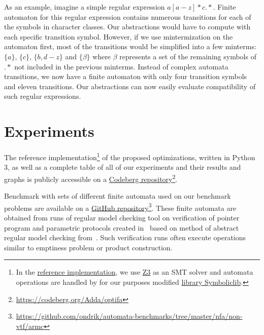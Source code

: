 As an example, imagine a simple regular expression $a[a-z]*c.*$. Finite automaton for this regular expression contains numerous transitions for each of the symbols in character classes. Our abstractions would have to compute with each specific transition symbol. However, if we use mintermization on the automaton first, most of the transitions would be simplified into a few minterms: $\{ a \}$, $\{ c \}$, $\{ b, d-z \}$ and $\{ \beta \}$ where $\beta$ represents a set of the remaining symbols of $.*$ not included in the previous minterms. Instead of complex automata transitions, we now have a finite automaton with only four transition symbols and eleven transitions. Our abstractions can now easily evaluate compatibility of such regular expressions.

\chapter{Experiments}\label{experimentsAndResultsChapter}

The reference implementation\footnote{In the \href{https://codeberg.org/Adda/optifa}{reference implementation}, we use \href{https://github.com/Z3Prover/z3}{Z3} as an SMT solver and automata operations are handled by for our purposes modified \href{https://codeberg.org/Adda/symboliclib}{library Symboliclib}.} of the proposed optimizations, written in Python 3, as well as a complete table of all of our experiments and their results and graphs is publicly accessible on a \href{https://codeberg.org/Adda/optifa}{Codeberg repository}\footnote{\url{https://codeberg.org/Adda/optifa}}.

Benchmark with sets of different finite automata used on our benchmark problems are available on a \href{https://github.com/ondrik/automata-benchmarks/tree/master/nfa/non-vtf/armc}{GitHub repository}\footnote{\url{https://github.com/ondrik/automata-benchmarks/tree/master/nfa/non-vtf/armc}}. These finite automata are obtained from runs of regular model checking tool on verification of pointer program and parametric protocols created in~\cite{model_checking_tool_10.1007/978-3-540-70844-5_7} based on method of abstract regular model checking from~\cite{method_model_checking_tool}. Such verification runs often execute operations similar to emptiness problem or product construction.

